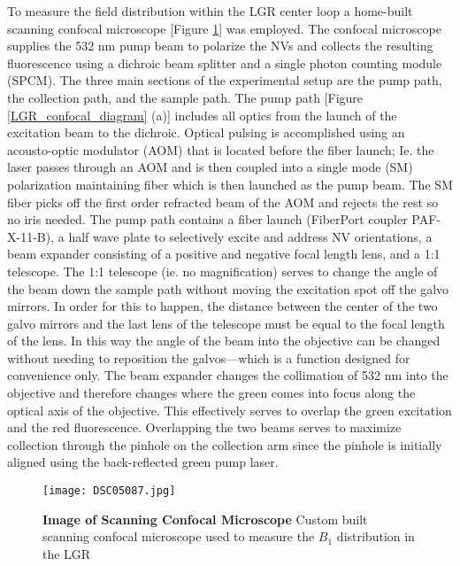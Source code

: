 To measure the field distribution within the LGR center loop a home-built scanning confocal microscope [Figure \ref{LGR_confocal_image}] was employed. The confocal microscope supplies the 532 nm pump beam to polarize the NVs and collects the resulting fluorescence using a dichroic beam splitter and a single photon counting module (SPCM). The three main sections of the experimental setup are the pump path, the collection path, and the sample path. The pump path [Figure \ref{LGR_confocal_diagram} (a)] includes all optics from the launch of the excitation beam to the dichroic. Optical pulsing is accomplished using an acousto-optic modulator (AOM) that is located before the fiber launch; Ie. the laser passes through an AOM and is then coupled into a single mode (SM) polarization maintaining fiber which is then launched as the pump beam. The SM fiber picks off the first order refracted beam of the AOM and rejects the rest so no iris needed. The pump path contains a fiber launch (FiberPort coupler PAF-X-11-B), a half wave plate to selectively excite and address NV orientations, a beam expander consisting of a positive and negative focal length lens, and a 1:1 telescope. The 1:1 telescope (ie. no magnification) serves to change the angle of the beam down the sample path without moving the excitation spot off the galvo mirrors. In order for this to happen, the distance between the center of the two galvo mirrors and the last lens of the telescope must be equal to the focal length of the lens. In this way the angle of the beam into the objective can be changed without needing to reposition the galvos---which is a function designed for convenience only. The beam expander changes the collimation of 532 nm into the objective and therefore changes where the green comes into focus along the optical axis of the objective. This effectively serves to overlap the green excitation and the red fluorescence. Overlapping the two beams serves to maximize collection through the pinhole on the collection arm since the pinhole is initially aligned using the back-reflected green pump laser.

\begin{figure}[t!]
\centering
\texttt{[image: DSC05087.jpg]}  
\caption{\textbf{Image of Scanning Confocal Microscope} Custom built scanning confocal microscope used to measure the $B_1$ distribution in the LGR}
\label{LGR_confocal_image}
\end{figure}

